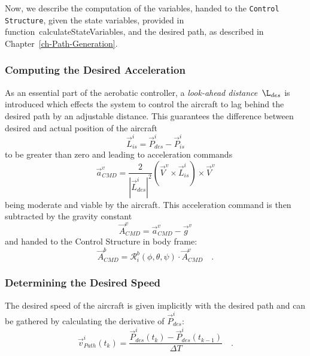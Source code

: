 \documentclass[11pt,a4paper]{scrartcl}		%
\begin{document}
Now, we describe the computation of the variables, handed to the \texttt{Control Structure}, given the state variables, provided in function~\textsf{calculateStateVariables}, and the desired path, as described in Chapter~\ref{ch-Path-Generation}.

\subsubsection*{Computing the Desired Acceleration}

As an essential part of the aerobatic controller, a \textsl{look-ahead distance}~$\L_{des}$ is introduced which effects the system to control the aircraft to lag behind the desired path by an adjustable distance.
This guarantees the difference between desired and actual position of the aircraft 
\begin{equation}
\vec{L}_{is}^i = \vec{P}_{des}^i - \vec{P}_{is}^i
\end{equation}
to be greater than zero and leading to acceleration commands 
\begin{equation}
\vec{a}_{CMD}^v = \frac{2}{|\vec{L}_{des}^i|^2}\left(\vec{V}^v \times \vec{L}_{is}^i \right) \times \vec{V}^v
\end{equation}
being moderate and viable by the aircraft.
This acceleration command is then subtracted by the gravity constant
\begin{equation}
\vec{A}_{CMD}^v = \vec{a}_{CMD}^v - \vec{g}^v
\end{equation}
and handed to the Control Structure in body frame:
\begin{equation}
\vec{A}_{CMD}^b = \mathcal{R}_i^b(\phi,\theta,\psi) \cdot \vec{A}_{CMD}^v \quad .
\end{equation}

\medskip





\subsubsection*{Determining the Desired Speed}\label{ch-Determ-Desired-Speed}

The desired speed of the aircraft is given implicitly with the desired path and can be gathered by calculating the derivative of $\vec{P}_{des}^i$:
\begin{equation}
\vec{v}_{Path}^i(t_k) = \frac{\vec{P}_{des}^i(t_k)-\vec{P}_{des}^i(t_{k-1})}{\Delta T}\quad .
\end{equation}
\end{document}

